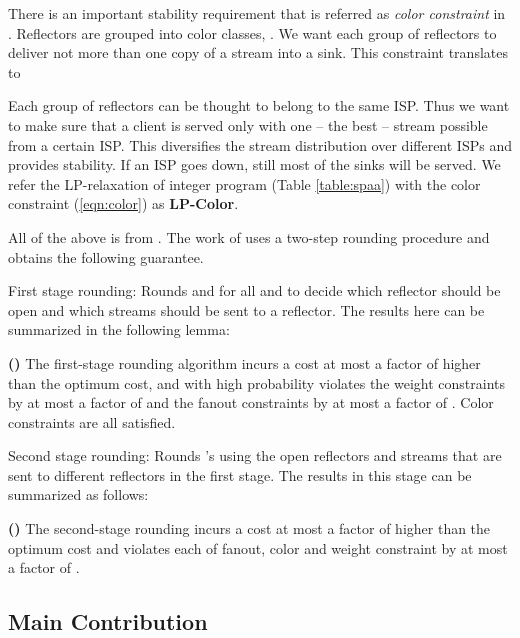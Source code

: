 There is an important  stability requirement that is referred as \emph{color constraint} in \cite{DBLP:conf/spaa/AndreevMMS03}. Reflectors are grouped into  color classes, . We want each group of reflectors to deliver not more than one copy of a stream into a sink. This constraint translates to


Each group of reflectors can be thought to belong to the same ISP. Thus we want to make sure that a client is served only with one -- the best -- stream possible from a certain ISP. This diversifies the stream distribution over different ISPs and provides stability. If an ISP goes down, still most of the sinks will be served. We refer the LP-relaxation of  integer program
(Table \ref{table:spaa}) with the color constraint (\ref{eqn:color})
as \textbf{LP-Color}.

All of the above is from \cite{DBLP:conf/spaa/AndreevMMS03}.
The work of \cite{DBLP:conf/spaa/AndreevMMS03} uses a two-step rounding procedure and obtains the following guarantee.

First stage rounding: Rounds  and  for all  and  to decide which reflector should be open and which streams should be sent to a reflector. The results here can be summarized in the following
lemma:

\begin{lemma}
\textbf{(\cite{DBLP:conf/spaa/AndreevMMS03})}
\label{lem:spaa1}
The first-stage rounding algorithm incurs a cost at most a factor of  higher than the optimum cost, and with high probability violates the weight constraints by at most a factor of  and the fanout constraints by at most a factor of . Color constraints are all satisfied.
\end{lemma}




Second stage rounding: Rounds 's using the open reflectors and streams that are sent to different reflectors in the first stage. The results in this stage can be summarized as follows:

\begin{lemma}
\textbf{(\cite{DBLP:conf/spaa/AndreevMMS03})}
\label{lem:spaa2}
The second-stage rounding incurs a cost at most a factor of  higher than the optimum cost and violates each of fanout, color and weight constraint by at most a factor of .
\end{lemma}

\subsection{Main Contribution}

